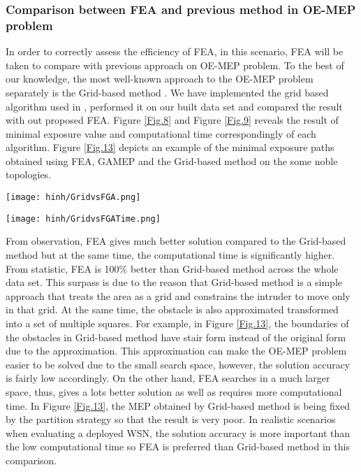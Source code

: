 \documentclass[final]{elsarticle}
\begin{document}
\subsubsection{Comparison between FEA and previous method in OE-MEP problem}
In order to correctly assess the efficiency of FEA, in this scenario, FEA will be taken to compare with previous approach on OE-MEP problem. To the best of our knowledge, the most well-known approach to the OE-MEP problem separately is the Grid-based method \cite{liu2017obstacle}. We have implemented the grid based algorithm used in \cite{liu2017obstacle}, performed it on our built data set and compared the result with out proposed FEA. Figure \ref{Fig.8} and Figure \ref{Fig.9} reveals the result of minimal exposure value and computational time correspondingly of each algorithm. Figure \ref{Fig.13} depicts an example of the minimal exposure paths obtained using FEA, GAMEP \cite{binh2019efficient} and the Grid-based method on the some noble topologies. 
\begin{figure*}[h]
	\texttt{[image: hinh/GridvsFGA.png]}
	\centering
	\caption{The minimal exposure value comparison between FEA and Grid based method on some noble topologies
	}
	\label{Fig.8}       %
\end{figure*}
\begin{figure*}[h]
	\texttt{[image: hinh/GridvsFGATime.png]}
	\centering
	\caption{The computational time (sec) comparison between FEA and Grid based method on some noble topologies
	}
	\label{Fig.9}       %
\end{figure*}

From observation, FEA gives much better solution compared to the Grid-based method but at the same time, the computational time is significantly higher. From statistic, FEA is 100\% better than Grid-based method across the whole data set. This surpass is due to the reason that Grid-based method is a simple approach that treats the area as a grid and constrains the intruder to move only in that grid. At the same time, the obstacle is also approximated transformed into a set of multiple squares. For example, in Figure \ref{Fig.13}, the boundaries of the obstacles in Grid-based method have stair form instead of the original form due to the approximation. This approximation can make the OE-MEP problem easier to be solved due to the small search space, however, the solution accuracy is fairly low accordingly. On the other hand, FEA searches in a much larger space, thus, gives a lots better solution as well as requires more computational time. In Figure \ref{Fig.13}, the MEP obtained by Grid-based method is being fixed by the partition strategy so that the result is very poor. In realistic scenarios when evaluating a deployed WSN, the solution accuracy is more important than the low computational time so FEA is preferred than Grid-based method in this comparison. 
\end{document}

